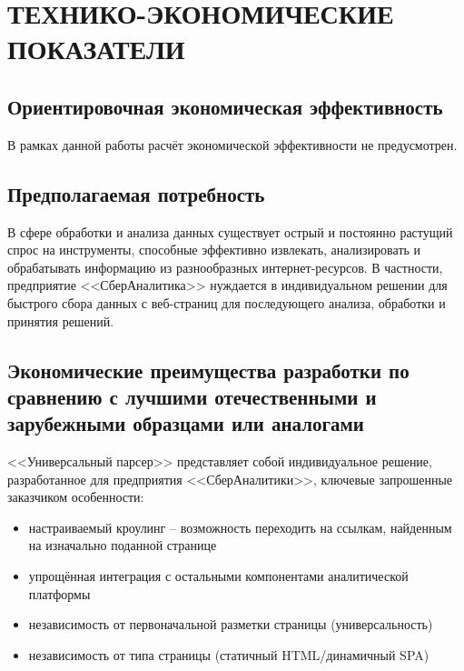 \section{ТЕХНИКО-ЭКОНОМИЧЕСКИЕ ПОКАЗАТЕЛИ}

\subsection{Ориентировочная экономическая эффективность}

В рамках данной работы расчёт экономической эффективности не предусмотрен.

\subsection{Предполагаемая потребность}

В сфере обработки и анализа данных существует острый и постоянно растущий спрос на инструменты, способные эффективно извлекать, анализировать и обрабатывать информацию из разнообразных интернет-ресурсов. В частности, предприятие <<СберАналитика>> нуждается в индивидуальном решении для быстрого сбора данных с веб-страниц для последующего анализа, обработки и принятия решений.


\subsection{Экономические преимущества разработки по сравнению с лучшими отечественными и зарубежными образцами или аналогами}

<<Универсальный парсер>> представляет собой индивидуальное решение, разработанное для предприятия <<СберАналитики>>, ключевые запрошенные заказчиком особенности:

\begin{itemize}
    \item настраиваемый кроулинг -- возможность переходить на ссылкам, найденным на изначально поданной странице
    \item упрощённая интеграция с остальными компонентами аналитической платформы
    \item независимость от первоначальной разметки страницы (универсальность)
    \item независимость от типа страницы (статичный HTML/динамичный SPA)
\end{itemize}